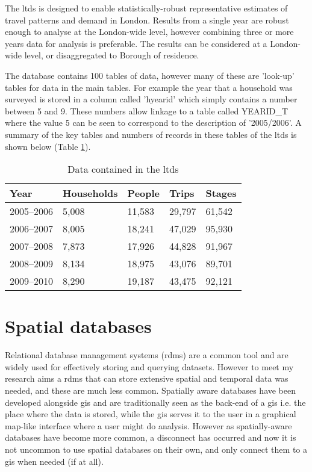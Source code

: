 The \gls{ltds} is designed to enable statistically-robust representative estimates of travel patterns and demand in London. Results from a single year are robust enough to analyse at the London-wide level, however combining three or more years data for analysis is preferable. The results can be considered at a London-wide level, or disaggregated to Borough of residence.

The database contains 100 tables of data, however many of these are 'look-up' tables for data in the main tables. For example the year that a household was surveyed is stored in a column called 'hyearid' which simply contains a number between 5 and 9. These numbers allow linkage to a table called YEARID\_T where the value 5 can be seen to correspond to the description of '2005/2006'. A summary of the key tables and numbers of records in these tables of the \gls{ltds} is shown below (Table \ref{tab:ltds_data}).

\begin{table}[H]
    \caption{Data contained in the \gls{ltds}}
    \begin{tabular}{ | p{2.2cm} | p{2.2cm} | p{2.2cm} | p{2.2cm} | p{2.2cm} |}
    \hline
    \textbf{Year} & \textbf{Households} & \textbf{People} & \textbf{Trips} & \textbf{Stages} \\ \hline
    2005--2006 & 5,008 & 11,583 & 29,797 & 61,542 \\ \hline
    2006--2007 & 8,005 & 18,241 & 47,029 & 95,930 \\ \hline
    2007--2008 & 7,873 & 17,926 & 44,828 & 91,967 \\ \hline
    2008--2009 & 8,134 & 18,975 & 43,076 & 89,701 \\ \hline
    2009--2010 & 8,290 & 19,187 & 43,475 & 92,121 \\ \hline
    \end{tabular}
    \label{tab:ltds_data}
\end{table}


\section{Spatial databases}
\label{sec:spatialdatabases}

Relational database management systems (\gls{rdms}) are a common tool and are widely used for effectively storing and querying datasets. However to meet my research aims a \gls{rdms} that can store extensive spatial and temporal data was needed, and these are much less common. Spatially aware databases have been developed alongside \gls{gis} and are traditionally seen as the back-end of a \gls{gis} i.e. the place where the data is stored, while the \gls{gis} serves it to the user in a graphical map-like interface where a user might do analysis. However as spatially-aware databases have become more common, a disconnect has occurred and now it is not uncommon to use spatial databases on their own, and only connect them to a \gls{gis} when needed (if at all).

